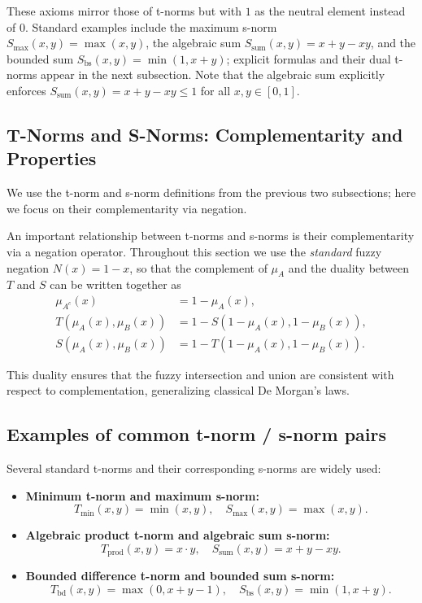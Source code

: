 These axioms mirror those of t\hyp{}norms but with \(1\) as the neutral element instead of \(0\). Standard examples include the maximum s\hyp{}norm \(S_{\max}(x, y) = \max(x, y)\), the algebraic sum \(S_{\text{sum}}(x, y) = x + y - xy\), and the bounded sum \(S_{\text{bs}}(x, y) = \min(1, x + y)\); explicit formulas and their dual t\hyp{}norms appear in the next subsection.
Note that the algebraic sum explicitly enforces \(S_{\text{sum}}(x, y)=x+y-xy \leq 1\) for all \(x, y \in [0,1]\).

\subsection{T-Norms and S-Norms: Complementarity and Properties}
\label{sec:fuzzysets_t_norms_and_s_norms_complementarity_and_properties}

We use the t\hyp{}norm and s\hyp{}norm definitions from the previous two subsections; here we focus on their complementarity via negation.

An important relationship between t\hyp{}norms and s\hyp{}norms is their complementarity via a negation operator. Throughout this section we use the \emph{standard} fuzzy negation \(N(x) = 1 - x\), so that the complement of \(\mu_A\) and the duality between \(T\) and \(S\) can be written together as
\begin{equation}
\begin{aligned}
\mu_{A^c}(x) &= 1 - \mu_A(x),\\
T(\mu_A(x), \mu_B(x)) &= 1 - S(1 - \mu_A(x), 1 - \mu_B(x)),\\
S(\mu_A(x), \mu_B(x)) &= 1 - T(1 - \mu_A(x), 1 - \mu_B(x)).
\end{aligned}
\label{eq:tnorm-snorm-complement}
\end{equation}

This duality ensures that the fuzzy intersection and union are consistent with respect to complementation, generalizing classical De Morgan's laws.

\subsection{Examples of common t\hyp{}norm / s\hyp{}norm pairs}
\label{sec:fuzzysets_examples_common_t_s_norm_pairs}

Several standard t\hyp{}norms and their corresponding s\hyp{}norms are widely used:

\begin{itemize}
    \item \textbf{Minimum t\hyp{}norm and maximum s\hyp{}norm:}
    \[
    T_{\min}(x, y) = \min(x, y), \quad S_{\max}(x, y) = \max(x, y).
    \]

    \item \textbf{Algebraic product t\hyp{}norm and algebraic sum s\hyp{}norm:}
    \[
    T_{\text{prod}}(x, y) = x \cdot y, \quad S_{\text{sum}}(x, y) = x + y - xy.
    \]

    \item \textbf{Bounded difference t\hyp{}norm and bounded sum s\hyp{}norm:}
    \[
    T_{\text{bd}}(x, y) = \max(0, x + y - 1), \quad S_{\text{bs}}(x, y) = \min(1, x + y).
    \]
\end{itemize}

